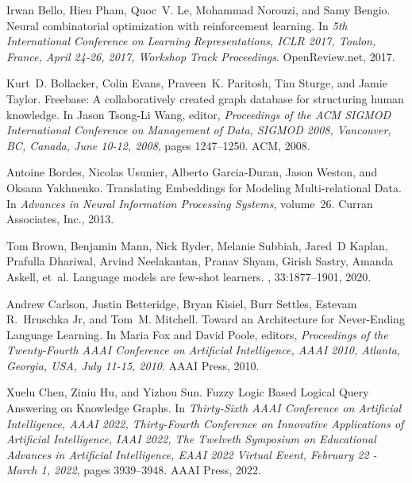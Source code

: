 \documentclass[11pt]{article}
\begin{document}
\begin{thebibliography}{10}
Irwan Bello, Hieu Pham, Quoc~V. Le, Mohammad Norouzi, and Samy Bengio.
\newblock Neural combinatorial optimization with reinforcement learning.
\newblock In {\em 5th International Conference on Learning Representations,
  {ICLR} 2017, Toulon, France, April 24-26, 2017, Workshop Track Proceedings}.
  OpenReview.net, 2017.

Kurt~D. Bollacker, Colin Evans, Praveen~K. Paritosh, Tim Sturge, and Jamie
  Taylor.
\newblock Freebase: A collaboratively created graph database for structuring
  human knowledge.
\newblock In Jason Tsong-Li Wang, editor, {\em Proceedings of the {{ACM SIGMOD
  International Conference}} on {{Management}} of {{Data}}, {{SIGMOD}} 2008,
  {{Vancouver}}, {{BC}}, {{Canada}}, {{June}} 10-12, 2008}, pages 1247--1250.
  {ACM}, 2008.

Antoine Bordes, Nicolas Usunier, Alberto {Garcia-Duran}, Jason Weston, and
  Oksana Yakhnenko.
\newblock Translating {{Embeddings}} for {{Modeling Multi-relational Data}}.
\newblock In {\em Advances in {{Neural Information Processing Systems}}},
  volume~26. {Curran Associates, Inc.}, 2013.

Tom Brown, Benjamin Mann, Nick Ryder, Melanie Subbiah, Jared~D Kaplan, Prafulla
  Dhariwal, Arvind Neelakantan, Pranav Shyam, Girish Sastry, Amanda Askell,
  et~al.
\newblock Language models are few-shot learners.
,
  33:1877--1901, 2020.

Andrew Carlson, Justin Betteridge, Bryan Kisiel, Burr Settles, Estevam
  R.~Hruschka Jr, and Tom~M. Mitchell.
\newblock Toward an {{Architecture}} for {{Never-Ending Language Learning}}.
\newblock In Maria Fox and David Poole, editors, {\em Proceedings of the
  {{Twenty-Fourth AAAI Conference}} on {{Artificial Intelligence}}, {{AAAI}}
  2010, {{Atlanta}}, {{Georgia}}, {{USA}}, {{July}} 11-15, 2010}. {AAAI Press},
  2010.

Xuelu Chen, Ziniu Hu, and Yizhou Sun.
\newblock Fuzzy {{Logic Based Logical Query Answering}} on {{Knowledge
  Graphs}}.
\newblock In {\em Thirty-{{Sixth AAAI Conference}} on {{Artificial
  Intelligence}}, {{AAAI}} 2022, {{Thirty-Fourth Conference}} on {{Innovative
  Applications}} of {{Artificial Intelligence}}, {{IAAI}} 2022, {{The Twelveth
  Symposium}} on {{Educational Advances}} in {{Artificial Intelligence}},
  {{EAAI}} 2022 {{Virtual Event}}, {{February}} 22 - {{March}} 1, 2022}, pages
  3939--3948. {AAAI Press}, 2022.


\end{thebibliography}
\end{document}
